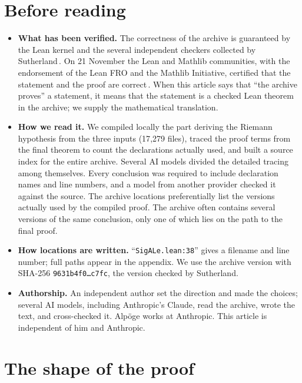 \documentclass[11pt]{article}
\newcommand{\Lean}[1]{\texttt{\small #1}}
\begin{document}
\section*{Before reading}
\begin{itemize}
\item \textbf{What has been verified.} The correctness of the archive is guaranteed by the Lean kernel and the several independent checkers collected by Sutherland\,\cite{sutherland}. On 21 November the Lean and Mathlib communities, with the endorsement of the Lean FRO and the Mathlib Initiative, certified that the statement and the proof are correct\,\cite{leanfro}. When this article says that ``the archive proves'' a statement, it means that the statement is a checked Lean theorem in the archive; we supply the mathematical translation.
\item \textbf{How we read it.} We compiled locally the part deriving the Riemann hypothesis from the three inputs (17{,}279 files), traced the proof terms from the final theorem to count the declarations actually used, and built a source index for the entire archive. Several AI models divided the detailed tracing among themselves. Every conclusion was required to include declaration names and line numbers, and a model from another provider checked it against the source. The archive locations preferentially list the versions actually used by the compiled proof. The archive often contains several versions of the same conclusion, only one of which lies on the path to the final proof.
\item \textbf{How locations are written.} ``\Lean{SigALe.lean:38}'' gives a filename and line number; full paths appear in the appendix. We use the archive version with SHA-256 \Lean{9631b4f0\ldots c7fc}, the version checked by Sutherland.
\item \textbf{Authorship.} An independent author set the direction and made the choices; several AI models, including Anthropic's Claude, read the archive, wrote the text, and cross-checked it. Alpöge works at Anthropic. This article is independent of him and Anthropic.
\end{itemize}

\section*{The shape of the proof}\label{sec:shape}
\end{document}
